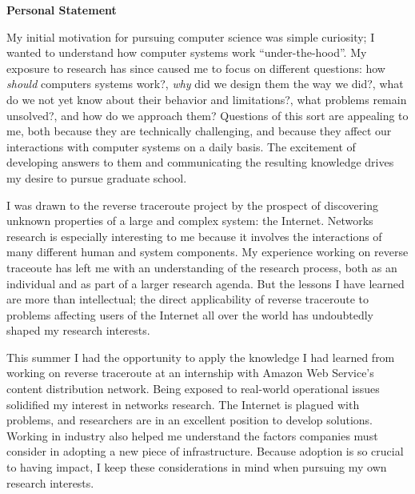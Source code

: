 \documentclass[12pt]{article}	%
\begin{document}
\begin{center}
{ \bf Personal Statement } 
\end{center}

%

My initial motivation for pursuing computer science was simple
curiosity; I wanted to understand how computer systems work ``under-the-hood''.
My exposure to research has since caused me to focus on different
questions: how {\em should} computers systems work?, {\em why} did we
design them the way we did?, what do we not yet know about their behavior and
limitations?, what problems remain unsolved?, and how do we approach them?
Questions of this sort are appealing to me, both because they are technically
challenging, and because they affect our interactions with computer systems on
a daily basis. The excitement of developing answers to them and communicating
the resulting knowledge drives my desire to pursue 
graduate school.

I was drawn to the reverse traceroute project by the prospect of discovering
unknown properties of a large and complex system: the Internet.
Networks research is especially interesting to me because it involves the
interactions of many different human and system components. My experience working on reverse traceoute has left me with an understanding
of the research process, both as an individual and as part of a larger research agenda.
But the lessons I have learned are more than intellectual;
the direct applicability of reverse traceroute to problems affecting users of the Internet all over the world
has undoubtedly shaped my research interests.

This summer I had the opportunity to apply the knowledge I had learned from
working on reverse traceroute at an internship with Amazon Web Service's content distribution network.
Being exposed to real-world operational issues solidified my interest in
networks research. The Internet is plagued with problems, and researchers are
in an excellent position to develop solutions. Working in industry also helped me understand the factors companies must consider in adopting
a new piece of infrastructure. Because adoption is so crucial to having 
impact, I keep these considerations in mind when pursuing my own research interests.
\end{document}

